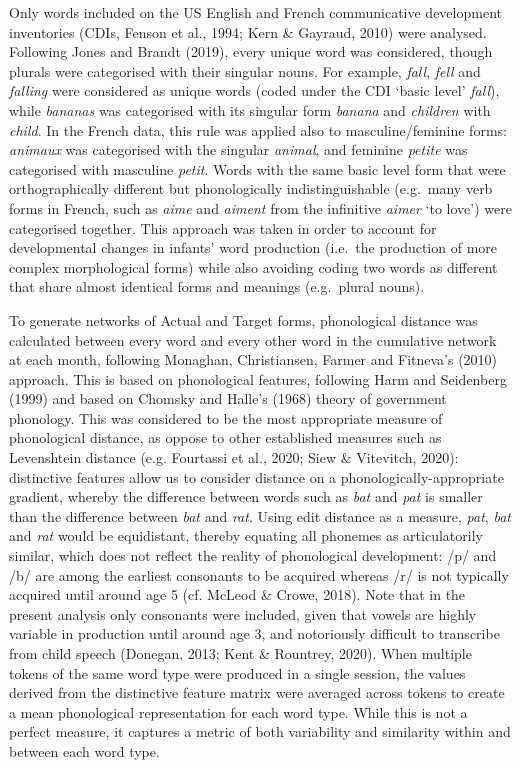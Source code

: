 \documentclass[
  man,mask,floatsintext]{apa6}
\begin{document}
Only words included on the US English and French communicative development inventories (CDIs, Fenson et al., 1994; Kern \& Gayraud, 2010) were analysed. Following Jones and Brandt (2019), every unique word was considered, though plurals were categorised with their singular nouns. For example, \emph{fall}, \emph{fell} and \emph{falling} were considered as unique words (coded under the CDI `basic level' \emph{fall}), while \emph{bananas} was categorised with its singular form \emph{banana} and \emph{children} with \emph{child}. In the French data, this rule was applied also to masculine/feminine forms: \emph{animaux} was categorised with the singular \emph{animal}, and feminine \emph{petite} was categorised with masculine \emph{petit}. Words with the same basic level form that were orthographically different but phonologically indistinguishable (e.g.~many verb forms in French, such as \emph{aime} and \emph{aiment} from the infinitive \emph{aimer} `to love') were categorised together. This approach was taken in order to account for developmental changes in infants' word production (i.e.~the production of more complex morphological forms) while also avoiding coding two words as different that share almost identical forms and meanings (e.g.~plural nouns).

To generate networks of Actual and Target forms, phonological distance was calculated between every word and every other word in the cumulative network at each month, following Monaghan, Christiansen, Farmer and Fitneva's (2010) approach. This is based on phonological features, following Harm and Seidenberg (1999) and based on Chomsky and Halle's (1968) theory of government phonology. This was considered to be the most appropriate measure of phonological distance, as oppose to other established measures such as Levenshtein distance (e.g. Fourtassi et al., 2020; Siew \& Vitevitch, 2020): distinctive features allow us to consider distance on a phonologically-appropriate gradient, whereby the difference between words such as \emph{bat} and \emph{pat} is smaller than the difference between \emph{bat} and \emph{rat}. Using edit distance as a measure, \emph{pat}, \emph{bat} and \emph{rat} would be equidistant, thereby equating all phonemes as articulatorily similar, which does not reflect the reality of phonological development: /p/ and /b/ are among the earliest consonants to be acquired whereas /r/ is not typically acquired until around age 5 (cf. McLeod \& Crowe, 2018). Note that in the present analysis only consonants were included, given that vowels are highly variable in production until around age 3, and notoriously difficult to transcribe from child speech (Donegan, 2013; Kent \& Rountrey, 2020). When multiple tokens of the same word type were produced in a single session, the values derived from the distinctive feature matrix were averaged across tokens to create a mean phonological representation for each word type. While this is not a perfect measure, it captures a metric of both variability and similarity within and between each word type.
\end{document}
